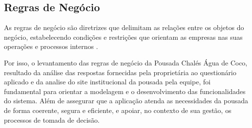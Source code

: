 \documentclass[
	12pt,				%
	openany,			%
	twoside,			%
	a4paper,			%
	english,			%
	french,				%
	spanish,			%
	brazil				%
	]{abntex2}
\begin{document}
\subsection{Regras de Negócio}
As regras de negócio são diretrizes que delimitam as relações entre os objetos do negócio, estabelecendo condições e restrições que orientam as empresas nas suas operações e processos internos \cite{ibmBusinessRules}. 

Por isso, o levantamento das regras de negócio da Pousada Chalés Água de Coco, resultado da análise das respostas fornecidas pela proprietária ao questionário aplicado e da analise do site institucional da pousada \cite{pousada_chales_agua_de_coco} pela equipe, foi fundamental para orientar a modelagem e o desenvolvimento das funcionalidades do sistema. Além de assegurar que a aplicação atenda as necessidades da pousada de forma coerente, segura  e eficiente, e apoiar, no contexto de sua gestão, os processos de tomada de decisão. 
%
\end{document}
